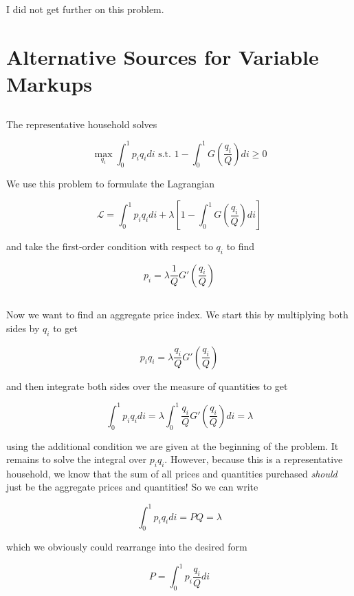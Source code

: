 \documentclass[12pt, letterpaper]{article}
\begin{document}
    I did not get further on this problem.


    
    \section{Alternative Sources for Variable Markups}

    \subsection{}

    The representative household solves

    \[ \max_{q_i} \int_0^1 p_i q_i di \text{ s.t. } 1 - \int_0^1 G\left(\frac{q_i}{Q}\right) di \geq 0    \]

    We use this problem to formulate the Lagrangian

    \[ \mathcal{L} = \int_0^1 p_i q_i di + \lambda \left[ 1 - \int_0^1 G\left(\frac{q_i}{Q}\right) di \right]  \]

    and take the first-order condition with respect to \(q_i\) to find

    \[ p_i = \lambda \frac{1}{Q} G'\left(\frac{q_i}{Q}\right)  \]

    \subsection{}

    Now we want to find an aggregate price index. We start this by multiplying both sides by \(q_i\) to get

    \[ p_i q_i = \lambda \frac{q_i}{Q} G'\left(\frac{q_i}{Q}\right)   \]

    and then integrate both sides over the measure of quantities to get 

    \[ \int_0^1 p_i q_i di = \lambda \int_0^1 \frac{q_i}{Q} G'\left(\frac{q_i}{Q}\right) di = \lambda   \]

    using the additional condition we are given at the beginning of the problem. It remains to solve the integral over \(p_i q_i\). However, because this is a representative household, we know that the sum of all prices and quantities purchased \emph{should} just be the aggregate prices and quantities! So we can write

    \[ \int_0^1 p_i q_i di = P Q = \lambda  \]

    which we obviously could rearrange into the desired form 

    \[ P = \int_0^1 p_i \frac{q_i}{Q} di    \]
\end{document}

